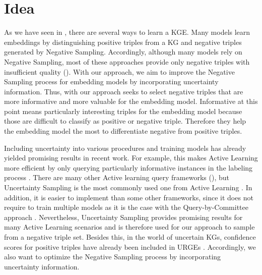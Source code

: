 \section{Idea} 
\label{sec:idea}


As we have seen in , there are several ways to learn a \ac{KGE}.
Many models learn embeddings by distinguishing positive triples from a \ac{KG} and negative triples generated by Negative Sampling.
Accordingly, although many models rely on Negative Sampling, most of these approaches provide only negative triples with insufficient quality ().
With our approach, we aim to improve the Negative Sampling process for embedding models by incorporating uncertainty information.
Thus, with our approach seeks to select negative triples that are more informative and more valuable for the embedding model.
Informative at this point means particularly interesting triples for the embedding model because those are difficult to classify as positive or negative triple.
Therefore they help the embedding model the most to differentiate negative from positive triples.

Including uncertainty into various procedures and training models has already yielded promising results in recent work.
For example, this makes Active Learning more efficient by only querying particularly informative instances in the labeling process .
There are many other Active learning query frameworks (), but Uncertainty Sampling is the most commonly used one from Active Learning \cite{Settles2009ActiveLL}.
In addition, it is easier to implement than some other frameworks, since it does not require to train multiple models as it is the case with the Query-by-Committee approach \cite{Settles2009ActiveLL}.
Nevertheless, Uncertainty Sampling provides promising results for many Active Learning scenarios and is therefore used for our approach to sample from a negative triple set.
Besides this, in the world of uncertain \acp{KG}, confidence scores for positive triples have already been included in \acp{URGE} \cite{UKGE}.
Accordingly, we also want to optimize the Negative Sampling process by incorporating uncertainty information.

